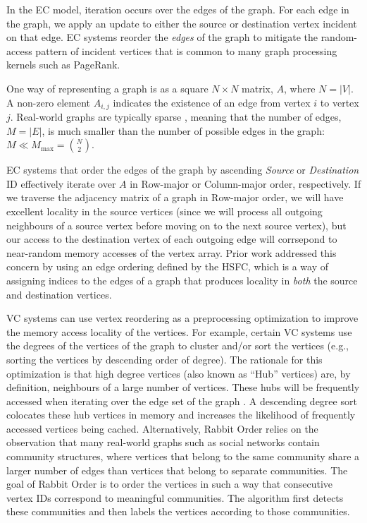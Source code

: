 \par In the \ac{EC} model, iteration occurs over the edges of the graph. For each edge in the graph, we apply an update to either the source or destination vertex incident on that edge. \ac{EC} systems reorder the \textit{edges} of the graph to mitigate the random-access pattern of incident vertices that is common to many graph processing kernels such as PageRank.

\par One way of representing a graph is as a square $N \times N$ matrix, $A$, where $N= |V|$. A non-zero element $A_{i, j}$ indicates the existence of an edge from vertex $i$ to vertex $j$. Real-world graphs are typically sparse \cite{listingkcliques}, meaning that the number of edges, $M=|E|$, is much smaller than the number of possible edges in the graph: $M\ll M_{\max} = {N \choose 2}$. 

\par \ac{EC} systems that order the edges of the graph by ascending \textit{Source} or \textit{Destination} ID effectively iterate over $A$ in Row-major or Column-major order, respectively. If we traverse the adjacency matrix of a graph in Row-major order, we will have excellent locality in the source vertices (since we will process all outgoing neighbours of a source vertex before moving on to the next source vertex), but our access to the destination vertex of each outgoing edge will corrsepond to near-random memory accesses of the vertex array. Prior work \cite{cost} addressed this concern by using an edge ordering defined by the \ac{HSFC}, which is a way of assigning indices to the edges of a graph that produces locality in \textit{both} the source and destination vertices. 

\par \ac{VC} systems can use vertex reordering as a preprocessing optimization to improve the memory access locality of the vertices. For example, certain \ac{VC} systems \cite{dbg, cagra} use the degrees of the vertices of the graph to cluster and/or sort the vertices (e.g., sorting the vertices by descending order of degree). The rationale for this optimization is that high degree vertices (also known as ``Hub'' vertices) are, by definition, neighbours of a large number of vertices. These hubs will be frequently accessed when iterating over the edge set of the graph \cite{lwr}. A descending degree sort colocates these hub vertices in memory and increases the likelihood of frequently accessed vertices being cached. Alternatively, Rabbit Order \cite{rabbit} relies on the observation that many real-world graphs such as social networks contain community structures, where vertices that belong to the same community share a larger number of edges than vertices that belong to separate communities. The goal of Rabbit Order is to order the vertices in such a way that consecutive vertex IDs correspond to meaningful communities. The algorithm first detects these communities and then labels the vertices according to those communities. 


